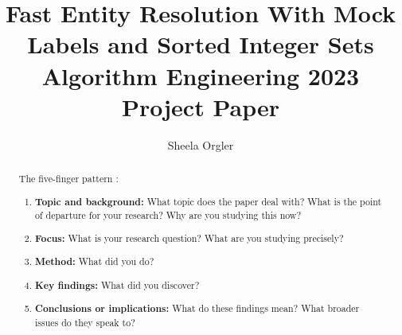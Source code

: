 \documentclass[sigconf]{acmart}
\begin{document}
\title[Fast Entity Resolution With Mock Labels and Sorted Integer Sets]{Fast Entity Resolution With Mock Labels and Sorted Integer Sets\\\large Algorithm Engineering 2023 Project Paper}


\author{Sheela Orgler}



\begin{abstract}

The five-finger pattern \cite{macgilchrist2014}:
\begin{enumerate}
\item \textbf{Topic and background:} What topic does the paper deal with? What is the point of departure for your research? Why are you studying this now?
\item \textbf{Focus:} What is your research question? What are you studying precisely?
\item \textbf{Method:} What did you do?
\item \textbf{Key findings:} What did you discover?
\item \textbf{Conclusions or implications:} What do these findings mean? What broader issues do they speak to?
\end{enumerate}


\end{abstract}



\maketitle
\end{document}
